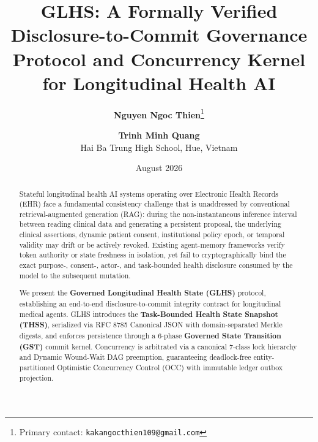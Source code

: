 \documentclass[11pt,a4paper]{article}
\title{\LARGE\textbf{GLHS: A Formally Verified Disclosure-to-Commit Governance Protocol and Concurrency Kernel for Longitudinal Health AI}}
\author{\textbf{Nguyen Ngoc Thien}\thanks{Primary contact: \texttt{kakangocthien109@gmail.com}} \quad\and\quad \textbf{Trinh Minh Quang}\\[0.35em]
\small Hai Ba Trung High School, Hue, Vietnam}
\date{August 2026}
\begin{document}
\maketitle

\begin{abstract}
Stateful longitudinal health AI systems operating over Electronic Health Records (EHR) face a fundamental consistency challenge that is unaddressed by conventional retrieval-augmented generation (RAG): during the non-instantaneous inference interval between reading clinical data and generating a persistent proposal, the underlying clinical assertions, dynamic patient consent, institutional policy epoch, or temporal validity may drift or be actively revoked. Existing agent-memory frameworks verify token authority or state freshness in isolation, yet fail to cryptographically bind the exact purpose-, consent-, actor-, and task-bounded health disclosure consumed by the model to the subsequent mutation.

We present the \textbf{Governed Longitudinal Health State (GLHS)} protocol, establishing an end-to-end disclosure-to-commit integrity contract for longitudinal medical agents. GLHS introduces the \textbf{Task-Bounded Health State Snapshot (THSS)}, serialized via RFC 8785 Canonical JSON with domain-separated Merkle digests, and enforces persistence through a 6-phase \textbf{Governed State Transition (GST)} commit kernel. Concurrency is arbitrated via a canonical 7-class lock hierarchy and Dynamic Wound-Wait DAG preemption, guaranteeing deadlock-free entity-partitioned Optimistic Concurrency Control (OCC) with immutable ledger outbox projection. 


\end{abstract}
\end{document}

